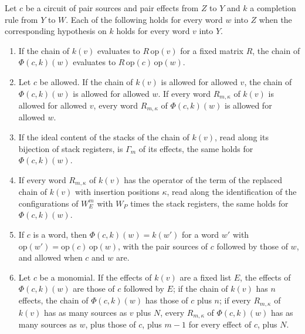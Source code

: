 \begin{theorem}
    \label{thm:party_chain_form_invariants}
    \leanok
    Let $c$ be a circuit of pair sources and pair effects from $Z$ to $Y$ and $k$ a
    completion rule from $Y$ to $W$. Each of the following holds for every word $w$
    into $Z$ when the corresponding hypothesis on $k$ holds for every word $v$ into
    $Y$.
    \begin{enumerate}
        \item If the chain of $k(v)$ evaluates to $R\,\mathrm{op}(v)$ for a fixed
              matrix $R$, the chain of $\Phi(c,k)(w)$ evaluates to
              $R\,\mathrm{op}(c)\,\mathrm{op}(w)$.
        \item Let $c$ be allowed. If the chain of $k(v)$ is allowed for allowed
              $v$, the chain of $\Phi(c,k)(w)$ is allowed for allowed $w$. If every
              word $R_{m,\kappa}$ of $k(v)$ is allowed for allowed $v$, every word
              $R_{m,\kappa}$ of $\Phi(c,k)(w)$ is allowed for allowed $w$.
        \item If the ideal content of the stacks of the chain of $k(v)$, read along
              its bijection of stack registers, is $\Gamma_m$ of its effects, the
              same holds for $\Phi(c,k)(w)$.
        \item If every word $R_{m,\kappa}$ of $k(v)$ has the operator of the term
              of the replaced chain of $k(v)$ with insertion positions $\kappa$, read
              along the identification of the configurations of $W^m_E$ with $W_P$
              times the stack registers, the same holds for $\Phi(c,k)(w)$.
        \item If $c$ is a word, then $\Phi(c,k)(w)=k(w')$ for a word $w'$ with
              $\mathrm{op}(w')=\mathrm{op}(c)\,\mathrm{op}(w)$, with the pair sources
              of $c$ followed by those of $w$, and allowed when $c$ and $w$ are.
        \item Let $c$ be a monomial. If the effects of $k(v)$ are a fixed list
              $E$, the effects of $\Phi(c,k)(w)$ are those of $c$ followed by $E$; if
              the chain of $k(v)$ has $n$ effects, the chain of $\Phi(c,k)(w)$ has
              those of $c$ plus $n$; if every $R_{m,\kappa}$ of $k(v)$ has as many
              sources as $v$ plus $N$, every $R_{m,\kappa}$ of $\Phi(c,k)(w)$ has
              as many sources as $w$, plus those of $c$, plus $m-1$ for every effect
              of $c$, plus $N$.
    \end{enumerate}
\end{theorem}

